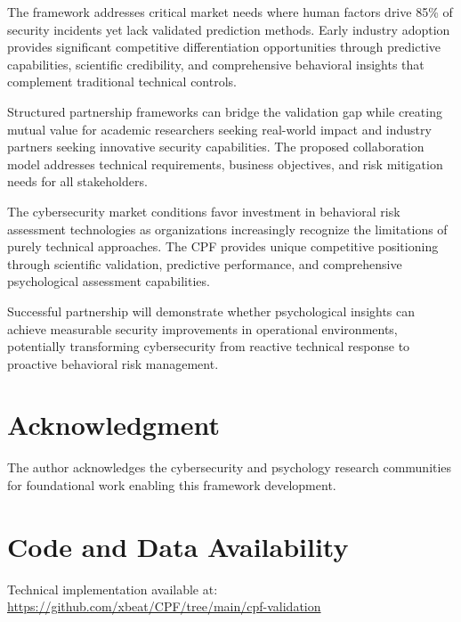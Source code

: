 \documentclass[10pt,twocolumn]{IEEEtran}
\begin{document}
The framework addresses critical market needs where human factors drive 85\% of security incidents yet lack validated prediction methods. Early industry adoption provides significant competitive differentiation opportunities through predictive capabilities, scientific credibility, and comprehensive behavioral insights that complement traditional technical controls.

Structured partnership frameworks can bridge the validation gap while creating mutual value for academic researchers seeking real-world impact and industry partners seeking innovative security capabilities. The proposed collaboration model addresses technical requirements, business objectives, and risk mitigation needs for all stakeholders.

The cybersecurity market conditions favor investment in behavioral risk assessment technologies as organizations increasingly recognize the limitations of purely technical approaches. The CPF provides unique competitive positioning through scientific validation, predictive performance, and comprehensive psychological assessment capabilities.

Successful partnership will demonstrate whether psychological insights can achieve measurable security improvements in operational environments, potentially transforming cybersecurity from reactive technical response to proactive behavioral risk management.

\section*{Acknowledgment}

The author acknowledges the cybersecurity and psychology research communities for foundational work enabling this framework development.

\section*{Code and Data Availability}

Technical implementation available at: \url{https://github.com/xbeat/CPF/tree/main/cpf-validation}


\end{document}
